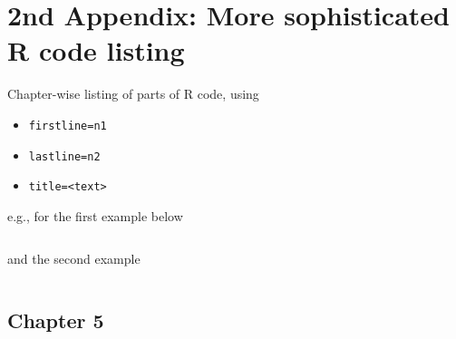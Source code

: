 \chapter{2nd Appendix: More sophisticated R code listing} \label{appendix-more-R}

Chapter-wise listing of parts of R code, using
\begin{itemize}
\item \texttt{firstline=n1}
\item \texttt{lastline=n2}
\item \texttt{title=<text>}
\end{itemize}
e.g., for the first example below
\begin{verbatim}

\end{verbatim}
and the second example
\begin{verbatim}

\end{verbatim}

% 

\bigskip%

\section{Chapter 5} \label{app 5}

% 


\medskip
                 

%
%


